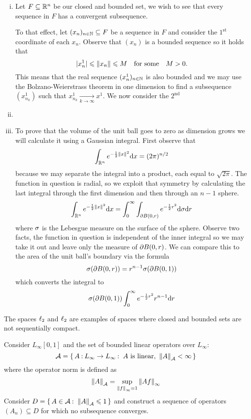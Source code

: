 \documentclass[12pt]{memoir}
\begin{document}
\begin{ptcbr}
    \begin{enumerate}[i)]
        \item Let $F\subseteq\mathbb{R}^n$ be our closed and bounded set, we wish to see that every sequence in $F$ has a convergent subsequence.\par 
        To that effect, let $(x_n)_{n\in\mathbb{N}}\subseteq F$ be a sequence in $F$ and consider the $1^{\text{st}}$ coordinate of each $x_n$. Observe that $(x_n)$ is a bounded sequence so it holds that 
        $$|x^1_n|\leqslant\norm{x_n}\leqslant M\quad\text{for some}\quad M>0.$$
        This means that the real sequence $(x^1_n)_{n\in\mathbb{N}}$ is also bounded and we may use the Bolzano-Weierstrass theorem in one dimension to find a subsequence $(x^1_{n_k})$ such that $x^1_{n_k}\xrightarrow[k\to\infty]{}x^1$. We now consider the $2^{\text{nd}}$
        \item {}
        \item To prove that the volume of the unit ball goes to zero as dimension grows we will calculate it using a Gaussian integral. First observe that 
        $$\int_{\bR^n}e^{-\half\norm{x}^2}\dd x=(2\pi)^{n/2}$$
        because we may separate the integral into a product, each equal to $\sqrt{2\pi}$. The function in question is radial, so we exploit that symmetry by calculating the last integral through the first dimension and then through an $n-1$ sphere. 
        $$\int_{\bR^n}e^{-\half\norm{x}^2}\dd x=\int_0^\infty\int_{\del B(0,r)}e^{-\half r^2}\dd\sg\dd r$$
        where $\sigma$ is the Lebesgue measure on the surface of the sphere. Observe two facts, the function in question is independent of the inner integral so we may take it out and leave only the measure of $\partial B(0,r)$. We can compare this to the area of the unit ball's boundary via the formula 
        $$\sigma(\partial B(0,r))=r^{n-1}\sigma(\partial B(0,1))$$
        which converts the integral to 
        $$\sg(\del B(0,1))\int_0^\infty e^{-\half r^2}r^{n-1}\dd r$$
    \end{enumerate}
\end{ptcbr}

\begin{Ej}
    The spaces $\ell_2$ and $\ell_2$ are examples of spaces where closed and bounded sets are not sequentially compact.\par 
    Consider $L_\infty[0,1]$ and the set of bounded linear operators over $L_\infty$: 
    $$\cA=\set{A\: L_\infty\to L_\infty\:\ A\ \text{is linear},\ \norm{A}_\cA<\infty}$$
    where the operator norm is defined as 
    $$\norm{A}_{\mathcal{A}}=\sup_{\norm{f}_{\infty}=1}\norm{Af}_{\infty}$$
    Consider $D=\{\,A\in\mathcal{A}\mathbin{:}\ \norm{A}_{\mathcal{A}}\leqslant 1\,\}$ and construct a sequence of operators $(A_n)\subseteq D$ for which no subsequence converges.
\end{Ej}
\end{document}
